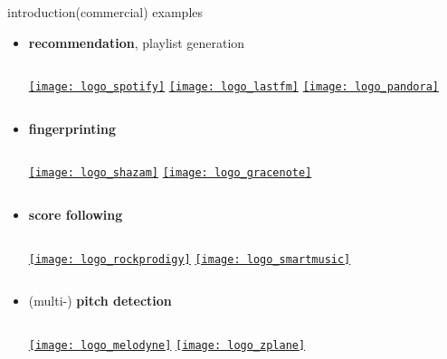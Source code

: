         \begin{frame}{introduction}{(commercial) examples}
            \begin{itemize}
                \item   \textbf{recommendation}, playlist generation
                    \begin{columns}
                            \href{https://www.spotify.com}{\texttt{[image: logo\_spotify]}}
                            \href{https://www.last.fm}{\texttt{[image: logo\_lastfm]}}
                            \href{https://www.pandora.com}{\texttt{[image: logo\_pandora]}}
                    \end{columns}
                \bigskip
                \item<1->   \textbf{fingerprinting} 
                    \begin{columns}
                            \href{https://www.shazam.com}{\texttt{[image: logo\_shazam]}}
                            \href{https://www.gracenote.com}{\texttt{[image: logo\_gracenote]}}
                    \end{columns}
                \bigskip
                \item<1->   \textbf{score following} 
                   \begin{columns}
                            \href{http://www.rockprodigy.com}{\texttt{[image: logo\_rockprodigy]}}
                            \href{https://www.smartmusic.com}{\texttt{[image: logo\_smartmusic]}}
                    \end{columns}
                \bigskip
                \item<1->   (multi-) \textbf{pitch detection} 
                    \begin{columns}
                            \href{http://www.celemony.com}{\texttt{[image: logo\_melodyne]}}
                            \href{http://www.zplane.de}{\texttt{[image: logo\_zplane]}}
                    \end{columns}
            \end{itemize}
        \end{frame}


